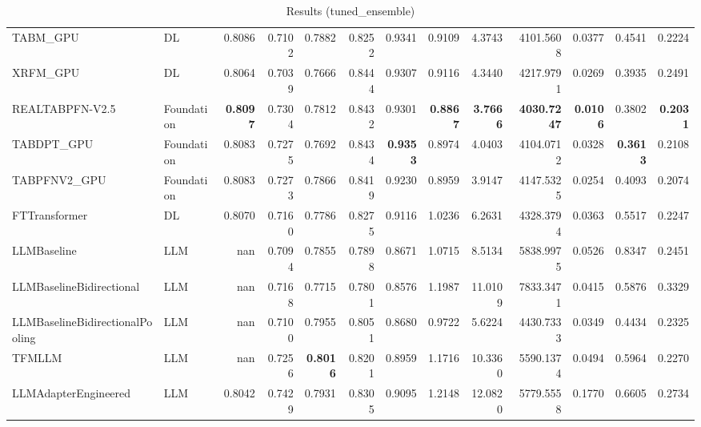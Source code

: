 \begin{table}[htbp]
{\begin{tabular}{ll|rrrrrrrrrrr}
TABM\_GPU & DL & 0.8086 & 0.7102 & 0.7882 & 0.8252 & 0.9341 & 0.9109 & 4.3743 & 4101.5608 & 0.0377 & 0.4541 & 0.2224 \\
XRFM\_GPU & DL & 0.8064 & 0.7039 & 0.7666 & 0.8444 & 0.9307 & 0.9116 & 4.3440 & 4217.9791 & 0.0269 & 0.3935 & 0.2491 \\
REALTABPFN-V2.5 & Foundation & \textbf{0.8097} & 0.7304 & 0.7812 & 0.8432 & 0.9301 & \textbf{0.8867} & \textbf{3.7666} & \textbf{4030.7247} & \textbf{0.0106} & 0.3802 & \textbf{0.2031} \\
TABDPT\_GPU & Foundation & 0.8083 & 0.7275 & 0.7692 & 0.8434 & \textbf{0.9353} & 0.8974 & 4.0403 & 4104.0712 & 0.0328 & \textbf{0.3613} & 0.2108 \\
TABPFNV2\_GPU & Foundation & 0.8083 & 0.7273 & 0.7866 & 0.8419 & 0.9230 & 0.8959 & 3.9147 & 4147.5325 & 0.0254 & 0.4093 & 0.2074 \\
\midrule
FTTransformer & DL & 0.8070 & 0.7160 & 0.7786 & 0.8275 & 0.9116 & 1.0236 & 6.2631 & 4328.3794 & 0.0363 & 0.5517 & 0.2247 \\
LLMBaseline & LLM & nan & 0.7094 & 0.7855 & 0.7898 & 0.8671 & 1.0715 & 8.5134 & 5838.9975 & 0.0526 & 0.8347 & 0.2451 \\
LLMBaselineBidirectional & LLM & nan & 0.7168 & 0.7715 & 0.7801 & 0.8576 & 1.1987 & 11.0109 & 7833.3471 & 0.0415 & 0.5876 & 0.3329 \\
LLMBaselineBidirectionalPooling & LLM & nan & 0.7100 & 0.7955 & 0.8051 & 0.8680 & 0.9722 & 5.6224 & 4430.7333 & 0.0349 & 0.4434 & 0.2325 \\
TFMLLM & LLM & nan & 0.7256 & \textbf{0.8016} & 0.8201 & 0.8959 & 1.1716 & 10.3360 & 5590.1374 & 0.0494 & 0.5964 & 0.2270 \\
LLMAdapterEngineered & LLM & 0.8042 & 0.7429 & 0.7931 & 0.8305 & 0.9095 & 1.2148 & 12.0820 & 5779.5558 & 0.1770 & 0.6605 & 0.2734 \\
\bottomrule
\end{tabular}
}
\caption{Results (tuned_ensemble)}
\label{tab:results_tuned_ensemble}
\end{table}